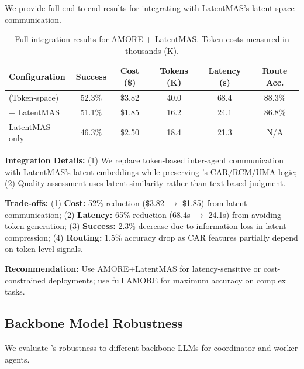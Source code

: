 \documentclass{article}
\theoremstyle{plain}
\theoremstyle{definition}
\theoremstyle{remark}
\begin{document}
We provide full end-to-end results for integrating \amore{} with LatentMAS's latent-space communication.

\begin{table}[h]
	\caption{Full integration results for AMORE + LatentMAS. Token costs measured in thousands (K).}
	\label{tab:latentmas_full}
	\centering
	\small
	\begin{tabular}{@{}lccccc@{}}
		\toprule
		\textbf{Configuration} & \textbf{Success} & \textbf{Cost (\$)} & \textbf{Tokens (K)} & \textbf{Latency (s)} & \textbf{Route Acc.} \\
		\midrule
		\amore{} (Token-space) & 52.3\% & \$3.82 & 40.0 & 68.4 & 88.3\% \\
		\amore{} + LatentMAS & 51.1\% & \$1.85 & 16.2 & 24.1 & 86.8\% \\
		LatentMAS only & 46.3\% & \$2.50 & 18.4 & 21.3 & N/A \\
		\bottomrule
	\end{tabular}
\end{table}

\textbf{Integration Details:} (1) We replace token-based inter-agent communication with LatentMAS's latent embeddings while preserving \amore{}'s CAR/RCM/UMA logic; (2) Quality assessment uses latent similarity rather than text-based judgment.

\textbf{Trade-offs:} (1) \textbf{Cost:} 52\% reduction (\$3.82 $\rightarrow$ \$1.85) from latent communication; (2) \textbf{Latency:} 65\% reduction (68.4s $\rightarrow$ 24.1s) from avoiding token generation; (3) \textbf{Success:} 2.3\% decrease due to information loss in latent compression; (4) \textbf{Routing:} 1.5\% accuracy drop as CAR features partially depend on token-level signals.

\textbf{Recommendation:} Use AMORE+LatentMAS for latency-sensitive or cost-constrained deployments; use full AMORE for maximum accuracy on complex tasks.

\subsection{Backbone Model Robustness}
\label{sec:backbone_robustness}

We evaluate \amore{}'s robustness to different backbone LLMs for coordinator and worker agents.
\end{document}
